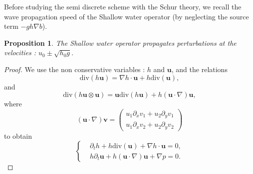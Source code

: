 \documentclass[a4paper, 11pt]{report}
\newtheorem{Proposition}{Proposition}
\begin{document}
Before studying the semi discrete scheme with the Schur theory, we recall the wave propagation speed of the Shallow water operator (by neglecting the source term $-gh\nabla b$).
\begin{Proposition}
The Shallow water operator propagates perturbations at the velocities : $u_0\pm\sqrt{h_0g}.$
\end{Proposition}
\begin{proof}
We use the non conservative variables : $h$ and $\boldsymbol{u}$, and the relations
\begin{equation*}
\text{div}\left(h\boldsymbol{u}\right)=\nabla h\cdot\boldsymbol{u}+h\text{div}\left(\boldsymbol{u}\right),
\end{equation*}
and
\begin{equation*}
\text{div}\left(h\boldsymbol{u}\otimes\boldsymbol{u}\right)=\boldsymbol{u}\text{div}\left(h\boldsymbol{u}\right)+h\left(\boldsymbol{u}\cdot\nabla\right)\boldsymbol{u},
\end{equation*}
where
\begin{equation*}
\left(\boldsymbol{u}\cdot\nabla\right)\boldsymbol{v}=\begin{pmatrix}u_1\partial_xv_1+u_2\partial_yv_1\\u_1\partial_xv_2+u_2\partial_yv_2\end{pmatrix}
\end{equation*}
to obtain 
\begin{equation*}
\left\{\begin{split}
&\partial_t h+h\text{div}(\boldsymbol{u})+\nabla h\cdot \boldsymbol{u}=0,\\
&h\partial_t \boldsymbol{u}+h\left(\boldsymbol{u}\cdot \nabla\right)\boldsymbol{u}+\nabla p=0.
\end{split}\right.
\end{equation*}


\end{proof}
\end{document}
